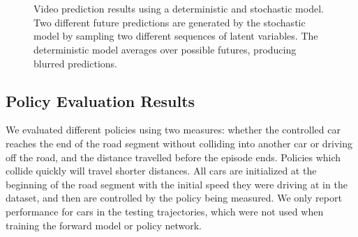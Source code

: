 \documentclass{article} %
\begin{document}
\begin{figure}[t!]
    \centering
     \\
     \\
    \caption{Video prediction results using a deterministic and stochastic model. Two different future predictions are generated by the stochastic model by sampling two different sequences of latent variables. The deterministic model averages over possible futures, producing blurred predictions.}
    \label{prediction-results}
\end{figure}









    \subsection{Policy Evaluation Results}

    We evaluated different policies using two measures: whether the controlled car reaches the end of the road segment without colliding into another car or driving off the road, and the distance travelled before the episode ends. Policies which collide quickly will travel shorter distances. All cars are initialized at the beginning of the road segment with the initial speed they were driving at in the dataset, and then are controlled by the policy being measured. We only report performance for cars in the testing trajectories, which were not used when training the forward model or policy network.
\end{document}
